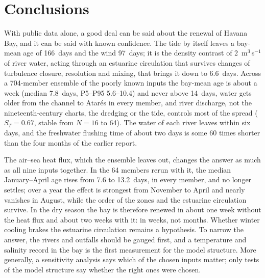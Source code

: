 \documentclass[a4paper,fleqn]{ems-dc}
\begin{document}
\section{Conclusions}\label{sec:conclusions}
With public data alone, a good deal can be said about the renewal of Havana Bay, and it can
be said with known confidence. The tide by itself leaves a bay-mean age of 166~days and the
wind 97~days; it is the density contrast of 2~m$^3$\,s$^{-1}$ of river water, acting through
an estuarine circulation that survives changes of turbulence closure, resolution and mixing,
that brings it down to 6.6~days. Across a 704-member ensemble of the poorly known inputs the
bay-mean age is about a week (median 7.8~days, P5--P95 5.6--10.4) and never above 14~days,
water gets older from the channel to Atar\'es in every member, and river discharge, not the
nineteenth-century charts, the dredging or the tide, controls most of the spread
($S_T = 0.67$, stable from $N = 16$ to 64). The water of each river leaves within six days,
and the freshwater flushing time of about two days is some 60 times shorter than the four
months of the earlier report.

The air--sea heat flux, which the ensemble leaves out, changes the answer as much as all nine
inputs together. In the 64 members rerun with it, the median January--April age rises from
7.6 to 13.2~days, in every member, and no longer settles; over a year the effect is strongest
from November to April and nearly vanishes in August, while the order of the zones and the
estuarine circulation survive. In the dry season the bay is therefore renewed in about one
week without the heat flux and about two weeks with it: in weeks, not months. Whether winter
cooling brakes the estuarine circulation remains a hypothesis. To narrow the answer, the
rivers and outfalls should be gauged first, and a temperature and salinity record in the bay
is the first measurement for the model structure. More generally, a sensitivity analysis
says which of the chosen inputs matter; only tests of the model structure say whether the
right ones were chosen.

\end{document}
